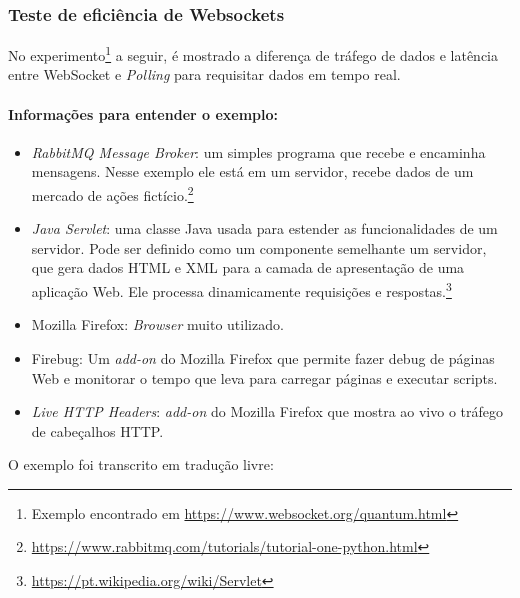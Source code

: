 \documentclass[a4paper,12pt]{article}
\begin{document}
\subsubsection{Teste de eficiência de Websockets}


No experimento\footnote{Exemplo encontrado em \url{https://www.websocket.org/quantum.html}} a seguir, é mostrado a diferença de tráfego de dados e latência entre WebSocket e \emph{Polling} para requisitar dados em tempo real.


\paragraph{Informações para entender o exemplo:}
\begin{itemize}
    \item \emph{RabbitMQ Message Broker}: um simples programa que recebe e encaminha mensagens. Nesse exemplo ele está em um servidor, recebe dados de um mercado de ações fictício.\footnote{\url{https://www.rabbitmq.com/tutorials/tutorial-one-python.html}}
    \item \emph{Java Servlet}: uma classe Java usada para estender as funcionalidades de um servidor. Pode ser definido como um componente semelhante um servidor, que gera dados HTML e XML para a camada de apresentação de uma aplicação Web. Ele processa dinamicamente requisições e respostas.\footnote{\url{https://pt.wikipedia.org/wiki/Servlet}}
    \item Mozilla Firefox: \emph{Browser} muito utilizado.
    \item Firebug: Um \emph{add-on} do Mozilla Firefox que permite fazer debug de páginas Web e monitorar o tempo que leva para carregar páginas e executar scripts.
    \item \emph{Live HTTP Headers}: \emph{add-on} do Mozilla Firefox que mostra ao vivo o tráfego de cabeçalhos HTTP.
\end{itemize}

 O exemplo foi transcrito em tradução livre:
\end{document}
